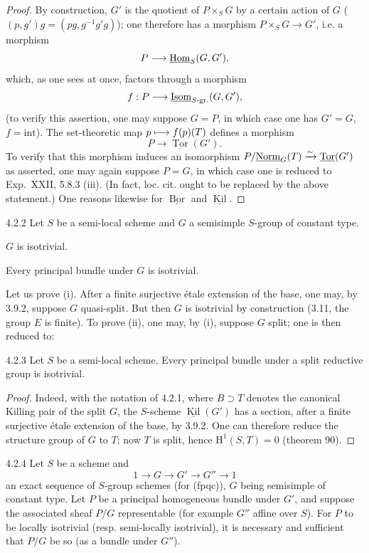 \begin{proof}
By construction, $G'$ is the quotient of $P\times_S G$ by a certain action of $G$ ($(p,g')g=(pg,g^{-1}g'g)$); one therefore has a morphism $P\times_S G\to G'$, i.e. a morphism
\[
P\longrightarrow\underline{\operatorname{Hom}}_S(G,G'),
\]
which, as one sees at once, factors through a morphism
\[
f:P\longrightarrow\underline{\operatorname{Isom}}_{S\text{-gr.}}(G,G'),
\]
(to verify this assertion, one may suppose $G=P$, in which case one has $G'=G$, $f=\mathrm{int}$). The set-theoretic map $p\longmapsto f(p)(T)$ defines a morphism
\[
P\to\underline{\operatorname{Tor}}(G').
\]
To verify that this morphism induces an isomorphism $P/\underline{\mathrm{Norm}}_G(T)\xrightarrow{\sim}\underline{\operatorname{Tor}}(G')$ as asserted, one may again suppose $P=G$, in which case one is reduced to Exp.~XXII, 5.8.3 (iii). (In fact, loc. cit. ought to be replaced by the above statement.) One reasons likewise for $\underline{\operatorname{Bor}}$ and $\underline{\operatorname{Kil}}$.
\end{proof}
\begin{proposition}{4.2.2}\label{XXIV.4.2.2}
Let $S$ be a semi-local scheme and $G$ a semisimple $S$-group of constant type.
\begin{enumeratei}
\item $G$ is isotrivial.
\item Every principal bundle under $G$ is isotrivial.
\end{enumeratei}
\end{proposition}
Let us prove (i). After a finite surjective étale extension of the base, one may, by 3.9.2, suppose $G$ quasi-split. But then $G$ is isotrivial by construction (3.11, the group $E$ is finite). To prove (ii), one may, by (i), suppose $G$ split; one is then reduced to:
\begin{lemma}{4.2.3}\label{XXIV.4.2.3}
Let $S$ be a semi-local scheme. Every principal bundle under a split reductive group is isotrivial.
\end{lemma}
\begin{proof}
Indeed, with the notation of 4.2.1, where $B\supset T$ denotes the canonical Killing pair of the split $G$, the $S$-scheme $\underline{\operatorname{Kil}}(G')$ has a section, after a finite surjective étale extension of the base, by 3.9.2. One can therefore reduce the structure group of $G$ to $T$; now $T$ is split, hence $\mathrm H^1(S,T)=0$ (theorem 90).
\end{proof}
\begin{corollary}{4.2.4}\label{XXIV.4.2.4}
Let $S$ be a scheme and
\[
1\to G\to G'\to G''\to1
\]
an exact sequence of $S$-group schemes (for (fpqc)), $G$ being semisimple of constant type. Let $P$ be a principal homogeneous bundle under $G'$, and suppose the associated sheaf $P/G$ representable (for example $G''$ affine over $S$). For $P$ to be locally isotrivial (resp. semi-locally isotrivial), it is necessary and sufficient that $P/G$ be so (as a bundle under $G''$\footnotemark[24]).
\end{corollary}

